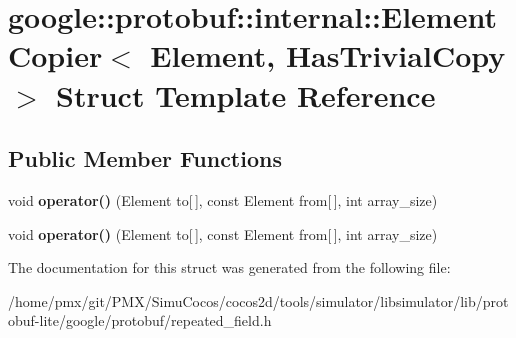 \hypertarget{structgoogle_1_1protobuf_1_1internal_1_1ElementCopier}{}\section{google\+:\+:protobuf\+:\+:internal\+:\+:Element\+Copier$<$ Element, Has\+Trivial\+Copy $>$ Struct Template Reference}
\label{structgoogle_1_1protobuf_1_1internal_1_1ElementCopier}
\subsection*{Public Member Functions}
\begin{DoxyCompactItemize}
\item 
\mbox{\label{structgoogle_1_1protobuf_1_1internal_1_1ElementCopier_a62da0a2eb3326550b19db64c11d3e6c0}} 
void {\bfseries operator()} (Element to\mbox{[}$\,$\mbox{]}, const Element from\mbox{[}$\,$\mbox{]}, int array\+\_\+size)
\item 
\mbox{\label{structgoogle_1_1protobuf_1_1internal_1_1ElementCopier_a62da0a2eb3326550b19db64c11d3e6c0}} 
void {\bfseries operator()} (Element to\mbox{[}$\,$\mbox{]}, const Element from\mbox{[}$\,$\mbox{]}, int array\+\_\+size)
\end{DoxyCompactItemize}


The documentation for this struct was generated from the following file\+:\begin{DoxyCompactItemize}
\item 
/home/pmx/git/\+P\+M\+X/\+Simu\+Cocos/cocos2d/tools/simulator/libsimulator/lib/protobuf-\/lite/google/protobuf/repeated\+\_\+field.\+h\end{DoxyCompactItemize}
